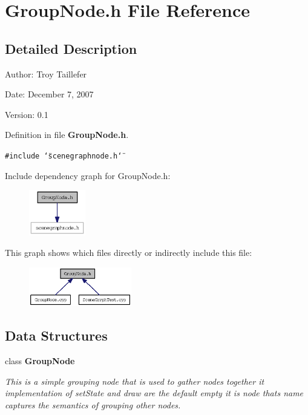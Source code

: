 \section{GroupNode.h File Reference}
\label{GroupNode_8h}


\subsection{Detailed Description}
\begin{Desc}
\item[Author:]Troy Taillefer \end{Desc}


\begin{Desc}
\item[Date:]December 7, 2007 \end{Desc}
\begin{Desc}
\item[Version:]0.1 \end{Desc}


Definition in file {\bf GroupNode.h}.

{\tt \#include \char`\"{}scenegraphnode.h\char`\"{}}\par


Include dependency graph for GroupNode.h:\nopagebreak
\begin{figure}[H]
\begin{center}
\leavevmode
\includegraphics[width=70pt]{GroupNode_8h__incl}
\end{center}
\end{figure}


This graph shows which files directly or indirectly include this file:\nopagebreak
\begin{figure}[H]
\begin{center}
\leavevmode
\includegraphics[width=127pt]{GroupNode_8h__dep__incl}
\end{center}
\end{figure}
\subsection*{Data Structures}
\begin{CompactItemize}
\item 
class {\bf GroupNode}
\begin{CompactList}\small\item\em This is a simple grouping node that is used to gather nodes together it implementation of setState and draw are the default empty it is node thats name captures the semantics of grouping other nodes. \item\end{CompactList}\end{CompactItemize}
